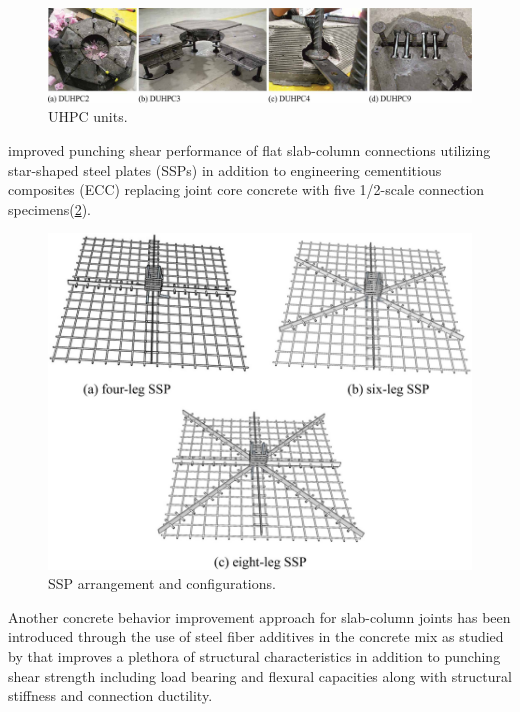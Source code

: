     \begin{figure}\centering
        \includegraphics[width=\textwidth]{Figures/r2017f2.pdf}\caption{UHPC units\citep{ricker2017}.}\label{r2017f2}
        \end{figure}
\cite{liu2023} improved punching shear performance of flat slab-column connections utilizing star-shaped steel plates (SSPs) in addition to engineering cementitious composites (ECC) replacing joint core concrete with five 1/2-scale connection specimens(\ref{l2023f3}).
    \begin{figure}\centering
        \includegraphics[width=\columnwidth]{Figures/l2023f3.png}\caption{SSP arrangement and configurations\citep{liu2023}.}\label{l2023f3}
        \end{figure}
Another concrete behavior improvement approach for slab-column joints has been introduced through the use of steel fiber additives in the concrete mix as studied by \cite{gouveia2018,gouveia2014,ABDELRAHMAN2018272,ju2015} that improves a plethora of structural characteristics in addition to punching shear strength including load bearing and flexural capacities along with structural stiffness and connection ductility. 

